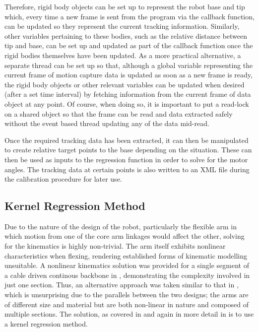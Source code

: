 \documentclass[11pt]{article}
\begin{document}
Therefore, rigid body objects can be set up to represent the robot base and tip which, every time a new frame is sent from the program via the callback function, can be updated so they represent the current tracking information. Similarly, other variables pertaining to these bodies, such as the relative distance between tip and base, can be set up and updated as part of the callback function once the rigid bodies themselves have been updated. As a more practical alternative, a separate thread can be set up so that, although a global variable representing the current frame of motion capture data is updated as soon as a new frame is ready, the rigid body objects or other relevant variables can be updated when desired (after a set time interval) by fetching information from the current frame of data object at any point. Of course, when doing so, it is important to put a read-lock on a shared object so that the frame can be read and data extracted safely without the event based thread updating any of the data mid-read.

Once the required tracking data has been extracted, it can then be manipulated to create relative target points to the base depending on the situation. These can then be used as inputs to the regression function in order to solve for the motor angles. The tracking data at certain points is also written to an XML file during the calibration procedure for later use.

\subsection{Kernel Regression Method}
Due to the nature of the design of the robot, particularly the flexible arm in which motion from one of the core arm linkages would affect the other, solving for the kinematics is highly non-trivial. The arm itself exhibits nonlinear characteristics when flexing, rendering established forms of kinematic modelling unsuitable. A nonlinear kinematics solution was provided for a single segment of a cable driven continous backbone in \cite{li2002}, demonstrating the complexity involved in just one section. Thus, an alternative approach was taken similar to that in \cite{GreggSmithDesign}, which is unsurprising due to the parallels between the two designs; the arms are of different size and material but are both non-linear in nature and composed of multiple sections. The solution, as covered in \cite{GreggSmithDesign} and again in more detail in \cite{GreggSmithPhd} is to use a kernel regression method.
\end{document}
